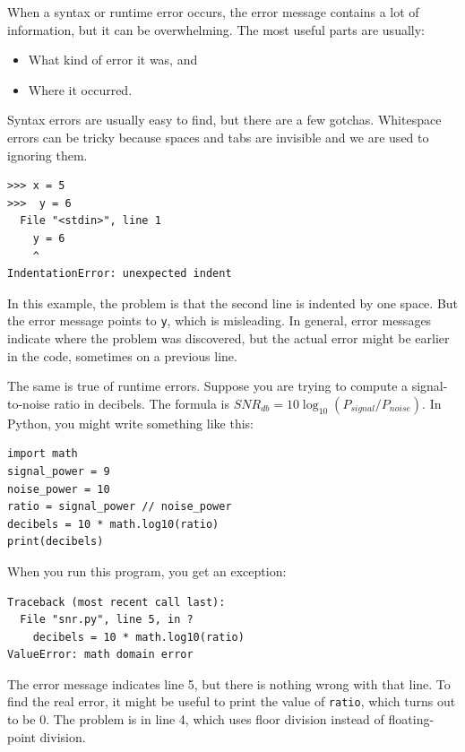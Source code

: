 \documentclass[10pt]{book}
\begin{document}
When a syntax or runtime error occurs, the error message contains
a lot of information, but it can be overwhelming.  The most
useful parts are usually:

\begin{itemize}

\item What kind of error it was, and

\item Where it occurred.

\end{itemize}

Syntax errors are usually easy to find, but there are a few
gotchas.  Whitespace errors can be tricky because spaces and
tabs are invisible and we are used to ignoring them.

\begin{verbatim}
>>> x = 5
>>>  y = 6
  File "<stdin>", line 1
    y = 6
    ^
IndentationError: unexpected indent
\end{verbatim}
%
In this example, the problem is that the second line is indented by
one space.  But the error message points to {\tt y}, which is
misleading.  In general, error messages indicate where the problem was
discovered, but the actual error might be earlier in the code,
sometimes on a previous line.

The same is true of runtime errors.  Suppose you are trying
to compute a signal-to-noise ratio in decibels.  The formula
is $SNR_{db} = 10 \log_{10} (P_{signal} / P_{noise})$.  In Python,
you might write something like this:

\begin{verbatim}
import math
signal_power = 9
noise_power = 10
ratio = signal_power // noise_power
decibels = 10 * math.log10(ratio)
print(decibels)
\end{verbatim}
%
When you run this program, you get an exception:
%

\begin{verbatim}
Traceback (most recent call last):
  File "snr.py", line 5, in ?
    decibels = 10 * math.log10(ratio)
ValueError: math domain error
\end{verbatim}
%
The error message indicates line 5, but there is nothing
wrong with that line.  To find the real error, it might be
useful to print the value of {\tt ratio}, which turns out to
be 0.  The problem is in line 4, which uses floor division
instead of floating-point division.
\end{document}
